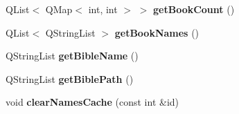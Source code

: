 \begin{DoxyCompactItemize}
\item 
\hypertarget{classSettings_a698e614462375008abf61710997b1832}{
QList$<$ QMap$<$ int, int $>$ $>$ {\bfseries getBookCount} ()}
\label{classSettings_a698e614462375008abf61710997b1832}

\item 
\hypertarget{classSettings_a0b510a4216bf2619147b3da503208361}{
QList$<$ QStringList $>$ {\bfseries getBookNames} ()}
\label{classSettings_a0b510a4216bf2619147b3da503208361}

\item 
\hypertarget{classSettings_a29df1fac942be48b89a199477e18ad9a}{
QStringList {\bfseries getBibleName} ()}
\label{classSettings_a29df1fac942be48b89a199477e18ad9a}

\item 
\hypertarget{classSettings_afdd99319b04b1dad6de2dbcb87650365}{
QStringList {\bfseries getBiblePath} ()}
\label{classSettings_afdd99319b04b1dad6de2dbcb87650365}

\item 
\hypertarget{classSettings_a742208f6ac5589af5acfcd6dbf6b4939}{
void {\bfseries clearNamesCache} (const int \&id)}
\label{classSettings_a742208f6ac5589af5acfcd6dbf6b4939}

\end{DoxyCompactItemize}
